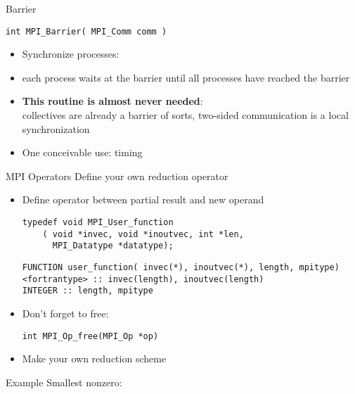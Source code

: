 \begin{numberedframe}{Barrier}
\begin{lstlisting}
int MPI_Barrier( MPI_Comm comm )
\end{lstlisting}
  \begin{itemize}
  \item Synchronize processes:
  \item each process waits at the barrier until all processes have reached the barrier
  \item \textbf{This routine is almost never needed}:\\
    collectives are already a barrier of sorts, two-sided
    communication is a local synchronization
  \item One conceivable use: timing
  \end{itemize}
\end{numberedframe}


\begin{numberedframe}{MPI Operators}
  Define your own reduction operator
  \begin{itemize}
  \item Define operator between partial result and new operand
\lstset{language=C}
\begin{lstlisting}
typedef void MPI_User_function
    ( void *invec, void *inoutvec, int *len, 
      MPI_Datatype *datatype); 
\end{lstlisting}
\lstset{language=Fortran}
\begin{lstlisting}
FUNCTION user_function( invec(*), inoutvec(*), length, mpitype)
<fortrantype> :: invec(length), inoutvec(length) 
INTEGER :: length, mpitype
\end{lstlisting}
\item Don't forget to free:
\lstset{language=C}
\begin{lstlisting}
int MPI_Op_free(MPI_Op *op)  
\end{lstlisting}
\item Make your own reduction scheme 
  \end{itemize}
\end{numberedframe}


\begin{numberedframe}{Example}
  Smallest nonzero:
  
\end{numberedframe}

